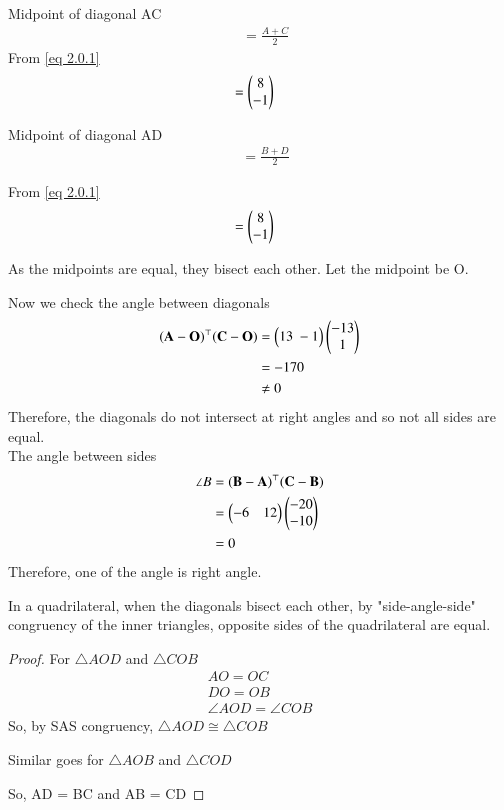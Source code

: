 \documentclass[journal,12pt,twocolumn]{IEEEtran}
\begin{document}
Midpoint of diagonal AC 
\begin{align}
    &= \frac{A+C}{2}
\end{align}
From \eqref{eq 2.0.1}
\begin{align}
    &= \begin{pmatrix}8 \\ -1\end{pmatrix}
\end{align}

Midpoint of diagonal AD 
\begin{align}
    &= \frac{B+D}{2}
\end{align}

From \eqref{eq 2.0.1}
\begin{align}
    &= \begin{pmatrix}8 \\ -1\end{pmatrix}
\end{align}

As the midpoints are equal, they bisect each other. Let the midpoint be O.

Now we check the angle between diagonals
\begin{align}
    (\vec{A}-\vec{O})^\top(\vec{C}-\vec{O})&= \myvec{13\ -1}\myvec{-13 \\ 1}\\
    &= -170 \\
    & \ne 0
\end{align}
Therefore, the diagonals do not intersect at right angles and so not all sides are equal.\\
The angle between sides 
\begin{align}
    \angle B &= (\mathbf{\mathbf{B} - \mathbf{A}})^\top(\mathbf{\mathbf{C} - \mathbf{B}}) \\ 
    &= \begin{pmatrix}-6 & 12\end{pmatrix} \begin{pmatrix}-20 \\ -10\end{pmatrix}\\
    &= 0
\end{align}
Therefore, one of the angle is right angle.
\begin{lemma}

In a quadrilateral, when the diagonals bisect each other, by "side-angle-side" congruency of the inner triangles, opposite sides of the quadrilateral are equal.
\end{lemma}

\begin{proof}
For $\triangle AOD$ and $\triangle COB$
\begin{align}
    AO = OC\\
    DO = OB\\
    \angle AOD = \angle COB
\end{align}
So, by SAS congruency, $\triangle AOD \cong \triangle COB$

Similar goes for $\triangle AOB$ and $\triangle COD$

So, AD = BC and AB = CD
\end{proof}
\end{document}
